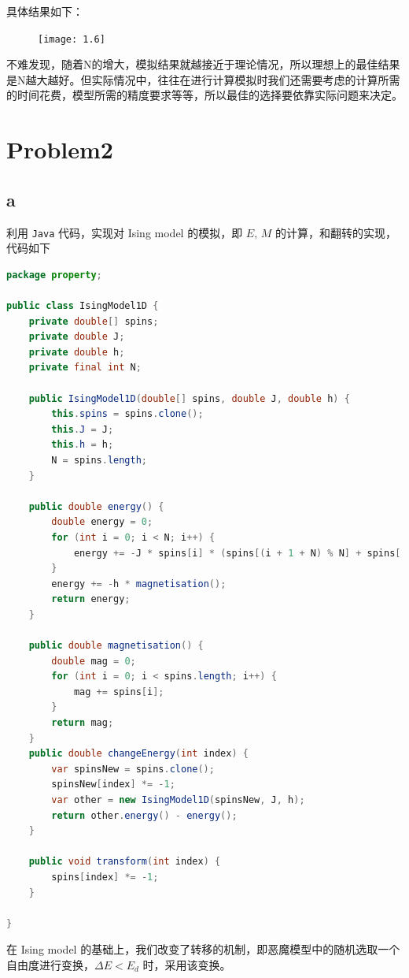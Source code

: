 \documentclass[UTF8]{ctexart}
\begin{document}
    具体结果如下：
    \begin{figure}[h]
        \centering
        \texttt{[image: 1.6]}
        \label{fig:1.6}
    \end{figure}

    不难发现，随着N的增大，模拟结果就越接近于理论情况，所以理想上的最佳结果是N越大越好。但实际情况中，往往在进行计算模拟时我们还需要考虑的计算所需的时间花费，模型所需的精度要求等等，所以最佳的选择要依靠实际问题来决定。

    \section{Problem2}\label{sec:2}
    \subsection{a}\label{subsec:2.1}
    利用 \texttt{Java} 代码，实现对 Ising model 的模拟，即 \(E, \, M\) 的计算，和翻转的实现，代码如下
    \begin{lstlisting}[language=Java, breaklines = true,label={lst:2.1.1}]
package property;

public class IsingModel1D {
    private double[] spins;
    private double J;
    private double h;
    private final int N;

    public IsingModel1D(double[] spins, double J, double h) {
        this.spins = spins.clone();
        this.J = J;
        this.h = h;
        N = spins.length;
    }

    public double energy() {
        double energy = 0;
        for (int i = 0; i < N; i++) {
            energy += -J * spins[i] * (spins[(i + 1 + N) % N] + spins[(i - 1 + N) % N]) / 2;
        }
        energy += -h * magnetisation();
        return energy;
    }

    public double magnetisation() {
        double mag = 0;
        for (int i = 0; i < spins.length; i++) {
            mag += spins[i];
        }
        return mag;
    }
    public double changeEnergy(int index) {
        var spinsNew = spins.clone();
        spinsNew[index] *= -1;
        var other = new IsingModel1D(spinsNew, J, h);
        return other.energy() - energy();
    }

    public void transform(int index) {
        spins[index] *= -1;
    }

}
    \end{lstlisting}

    在 Ising model 的基础上，我们改变了转移的机制，即恶魔模型中的随机选取一个自由度进行变换，\(\Delta E < E_d\) 时，采用该变换。
\end{document}
